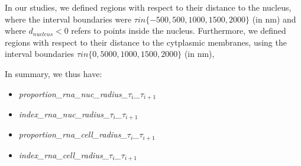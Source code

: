 In our studies, we defined regions with respect to their distance to the nucleus, where the interval boundaries were $\tau in \{-500, 500, 1000, 1500, 2000\}$ (in nm) and where $d_{nucleus}<0$ refers to points inside the nucleus. 
Furthermore, we defined regions with respect to their distance to the cytplasmic membranes, using the interval boundaries $\tau in \{0, 5000, 1000, 1500, 2000\}$ (in nm), 

In summary, we thus have:
\begin{itemize} 
    \item \emph{proportion\_rna\_nuc\_radius\_$\tau_i$\_$\tau_{i+1}$}
    \item \emph{index\_rna\_nuc\_radius\_$\tau_i$\_$\tau_{i+1}$}
    \item \emph{proportion\_rna\_cell\_radius\_$\tau_i$\_$\tau_{i+1}$}
    \item \emph{index\_rna\_cell\_radius\_$\tau_i$\_$\tau_{i+1}$}
\end{itemize}




